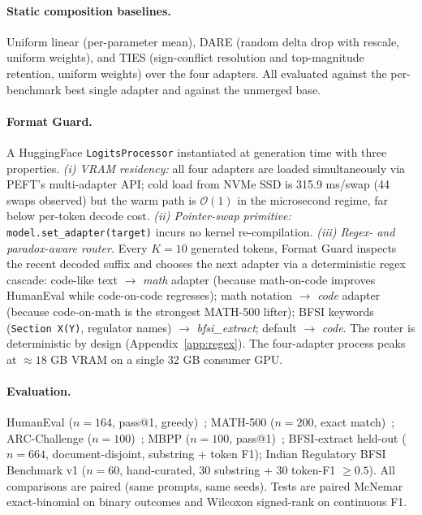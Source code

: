 \documentclass{article}
\begin{document}
\paragraph{Static composition baselines.} Uniform linear (per-parameter mean), DARE (random delta drop with rescale, uniform weights), and TIES (sign-conflict resolution and top-magnitude retention, uniform weights) over the four adapters. All evaluated against the per-benchmark best single adapter and against the unmerged base.

\paragraph{Format Guard.} A HuggingFace \texttt{LogitsProcessor} instantiated at generation time with three properties. \emph{(i) VRAM residency:} all four adapters are loaded simultaneously via PEFT's multi-adapter API; cold load from NVMe SSD is 315.9 ms/swap (44 swaps observed) but the warm path is $\mathcal{O}(1)$ in the microsecond regime, far below per-token decode cost. \emph{(ii) Pointer-swap primitive:} \texttt{model.set\_adapter(target)} incurs no kernel re-compilation. \emph{(iii) Regex- and paradox-aware router.} Every $K{=}10$ generated tokens, Format Guard inspects the recent decoded suffix and chooses the next adapter via a deterministic regex cascade: code-like text $\rightarrow$ \emph{math} adapter (because math-on-code improves HumanEval while code-on-code regresses); math notation $\rightarrow$ \emph{code} adapter (because code-on-math is the strongest MATH-500 lifter); BFSI keywords (\texttt{Section X(Y)}, regulator names) $\rightarrow$ \emph{bfsi\_extract}; default $\rightarrow$ \emph{code}. The router is deterministic by design (Appendix~\ref{app:regex}). The four-adapter process peaks at $\approx 18$ GB VRAM on a single 32 GB consumer GPU.

\paragraph{Evaluation.} HumanEval ($n=164$, pass@1, greedy)~\cite{chen2021evaluating}; MATH-500 ($n=200$, exact match)~\cite{hendrycks2021math}; ARC-Challenge ($n=100$)~\cite{clark2018arc}; MBPP ($n=100$, pass@1)~\cite{austin2021mbpp}; BFSI-extract held-out ($n=664$, document-disjoint, substring + token F1); Indian Regulatory BFSI Benchmark v1 ($n=60$, hand-curated, 30 substring + 30 token-F1 $\geq 0.5$). All comparisons are paired (same prompts, same seeds). Tests are paired McNemar exact-binomial on binary outcomes and Wilcoxon signed-rank on continuous F1.
\end{document}
